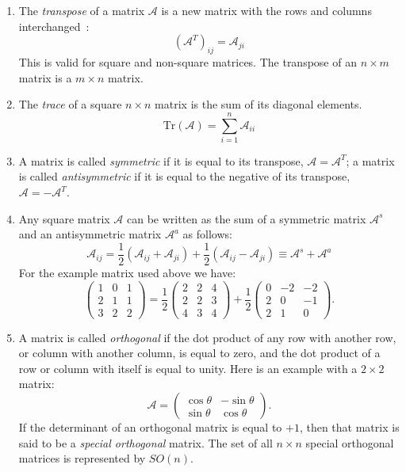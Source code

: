 \begin{enumerate}
\item The \textit{transpose} of a matrix $\mathcal{A}$ is a new matrix with the rows and columns interchanged~:
\[
\left(\mathcal{A}^{T}\right)_{ij}=\mathcal{A}_{ji}
\]
This is valid for square and non-square matrices.  The transpose of an $n\times m$ matrix is a $m\times n$ matrix.

\item The \textit{trace} of a square $n\times n$ matrix is the sum of its diagonal elements.
\[
\text{Tr}(\mathcal{A})=\sum_{i=1}^{n}\mathcal{A}_{ii}
\]

\item A matrix is called \textit{symmetric} if it is equal to its transpose, $\mathcal{A}=\mathcal{A}^T$; a matrix is called \textit{antisymmetric} if it is equal to the negative of its transpose, $\mathcal{A}=-\mathcal{A}^T$.

\item Any square matrix $\mathcal{A}$ can be written as the sum of a symmetric matrix $\mathcal{A}^s$ and an antisymmetric matrix $\mathcal{A}^a$ as follows:
\[
	\mathcal{A}_{ij} = \frac{1}{2}\left(\mathcal{A}_{ij}+\mathcal{A}_{ji}\right) + \frac{1}{2}\left(\mathcal{A}_{ij}-\mathcal{A}_{ji}\right) \equiv \mathcal{A}^s + \mathcal{A}^a 
\]
For the example matrix used above we have:
\[
	\begin{pmatrix}1&0&1\\ 2&1&1\\ 3&2&2\end{pmatrix} = \frac{1}{2}\begin{pmatrix}2&2&4\\ 2&2&3\\ 4&3&4\end{pmatrix}+\frac{1}{2}\begin{pmatrix}0&-2&-2\\ 2& 0 &-1\\ 2&1&0\end{pmatrix}.
\]

\item A matrix is called \textit{orthogonal} if the dot product of any row with another row, or column with another column, is equal to zero, and the dot product of a row or column with itself is equal to unity.  
Here is an example with a $2\times 2$ matrix:
\[
	\mathcal{A}=\begin{pmatrix}\cos\theta& -\sin\theta\\ \sin\theta& \cos\theta\end{pmatrix}.
\]
If the determinant of an orthogonal matrix is equal to $+1$, then that matrix is said to be a \textit{special orthogonal} matrix. The set of all $n\times n$ special orthogonal matrices is represented by $SO(n)$.
\end{enumerate} 

